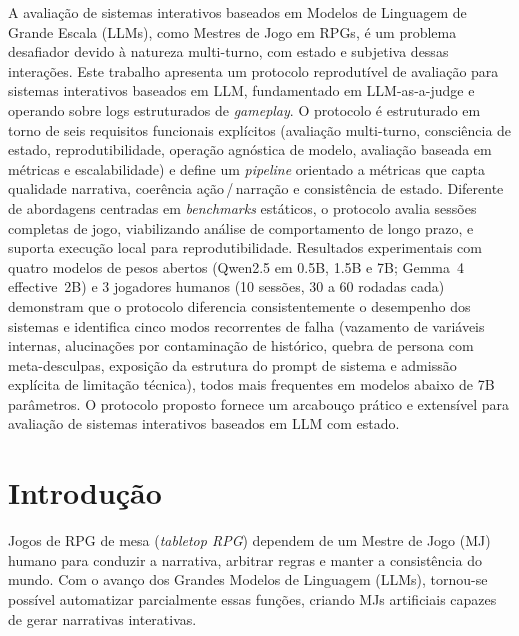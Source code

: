 \documentclass[12pt]{article}
\begin{document}
\begin{resumo}
A avaliação de sistemas interativos baseados em Modelos de Linguagem de Grande Escala (LLMs), como Mestres de Jogo em RPGs, é um problema desafiador devido à natureza multi-turno, com estado e subjetiva dessas interações. Este trabalho apresenta um protocolo reprodutível de avaliação para sistemas interativos baseados em LLM, fundamentado em LLM-as-a-judge e operando sobre logs estruturados de \textit{gameplay}. O protocolo é estruturado em torno de seis requisitos funcionais explícitos (avaliação multi-turno, consciência de estado, reprodutibilidade, operação agnóstica de modelo, avaliação baseada em métricas e escalabilidade) e define um \textit{pipeline} orientado a métricas que capta qualidade narrativa, coerência ação\,/\,narração e consistência de estado. Diferente de abordagens centradas em \textit{benchmarks} estáticos, o protocolo avalia sessões completas de jogo, viabilizando análise de comportamento de longo prazo, e suporta execução local para reprodutibilidade. Resultados experimentais com quatro modelos de pesos abertos (Qwen2.5 em 0.5B, 1.5B e 7B; Gemma~4 effective~2B) e 3 jogadores humanos (10 sessões, 30 a 60 rodadas cada) demonstram que o protocolo diferencia consistentemente o desempenho dos sistemas e identifica cinco modos recorrentes de falha (vazamento de variáveis internas, alucinações por contaminação de histórico, quebra de persona com meta-desculpas, exposição da estrutura do prompt de sistema e admissão explícita de limitação técnica), todos mais frequentes em modelos abaixo de 7B parâmetros. O protocolo proposto fornece um arcabouço prático e extensível para avaliação de sistemas interativos baseados em LLM com estado.
\end{resumo}


\section{Introdução}

Jogos de RPG de mesa (\textit{tabletop RPG}) dependem de um Mestre de Jogo (MJ) humano para conduzir a narrativa, arbitrar regras e manter a consistência do mundo. Com o avanço dos Grandes Modelos de Linguagem (LLMs), tornou-se possível automatizar parcialmente essas funções, criando MJs artificiais capazes de gerar narrativas interativas.
\end{document}
